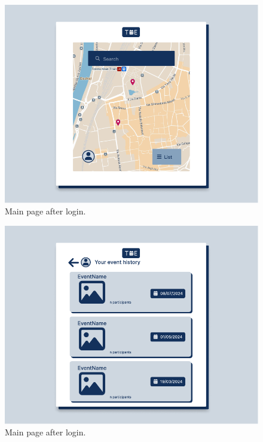 \documentclass[9pt]{extarticle}
\begin{document}
\begin{figure}[!htb]
	\centering
	\includegraphics[width=.7\linewidth]{./images/SeeAvailableLocations.pdf}
	\caption{Main page after login.}
	\label{fig:seeAvailableLocations}
\end{figure}

\begin{figure}[!htb]
	\centering
	\includegraphics[width=.7\linewidth]{./images/userEventHistory.pdf}
	\caption{Main page after login.}
	\label{fig:userEventHistory}
\end{figure}
\end{document}
